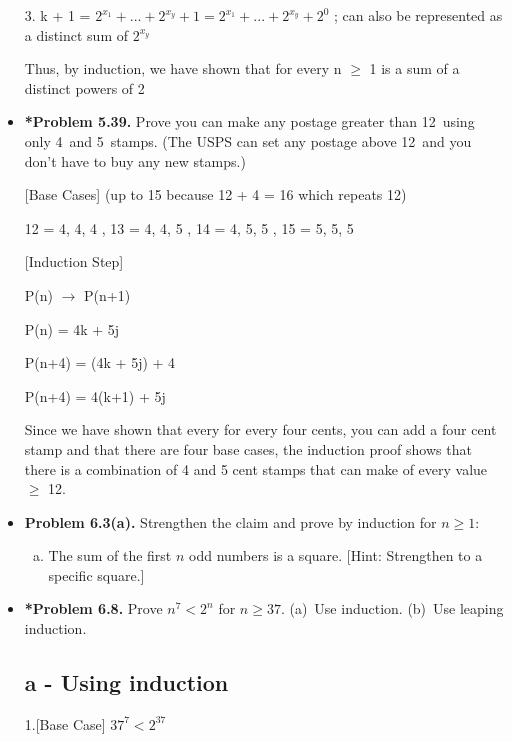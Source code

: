\documentclass[11pt]{article}
\def\imp{\rightarrow}
\begin{document}
\begin{itemize}
  3. k + 1 = $2^{x_1} + ... +2^{x_y} + 1 = 2^{x_1} + ... +2^{x_y} + 2^0$ ; can also be represented as a distinct sum of $2^{x_y}$

  Thus, by induction, we have shown that for every n $\geq$ 1 is a sum of a distinct powers of 2

\vspace{0.1in}

\item \textbf{*Problem 5.39.}
  Prove you can make any postage greater than 12\textcent\
  using only 4\textcent\  and 5\textcent\  stamps.
  (The USPS can set any postage above 12\textcent\  and you don't have to buy any new stamps.)

  [Base Cases] (up to 15 because 12 + 4 = 16 which repeats 12)

  12 = 4, 4, 4 , 13 = 4, 4, 5 , 14 = 4, 5, 5 , 15 = 5, 5, 5

  [Induction Step]

  P(n) $\imp$ P(n+1)

  P(n) = 4k + 5j

  P(n+4) = (4k + 5j) + 4

  P(n+4) = 4(k+1) + 5j

  Since we have shown that every for every four cents, you can add a four cent stamp and that there are four base cases, the induction proof shows that there is a combination of 4 and 5 cent stamps that can make of every value $ \geq $ 12.


\vspace{0.1in}

\item \textbf{Problem 6.3(a).}
  Strengthen the claim and prove by induction for $n\ge 1$:
  \begin{enumerate}[(a)]
  \item The sum of the first $n$ odd numbers is a square.
    [Hint: Strengthen to a specific square.]
  \end{enumerate}

\vspace{0.1in}

\item \textbf{*Problem 6.8.}
  Prove $n^7<2^n$ for $n\ge 37$.
  (a)~Use induction.
  (b)~Use leaping induction.

  \subsection*{a - Using induction}

  1.[Base Case] $37^7 < 2^{37}$


\end{itemize}
\end{document}
